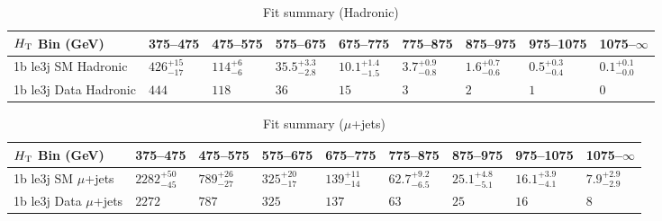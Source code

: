 \documentclass[8pt]{article}
\def\scalht{\mbox{$H_{\rm{T}}$}\xspace}
\newcommand\T{\rule{0pt}{2.6ex}}
\begin{document}
\begin{table}[ht!]
\caption{Fit summary (Hadronic)}
\label{tab:ensemble-summary}
\centering
\begin{tabular}{ lllllllll }

\hline
\scalht Bin (GeV)       & 375--475                       & 475--575                       & 575--675                       & 675--775                       & 775--875                       & 875--975                       & 975--1075                      & 1075--$\infty$                 \\ [1.000000ex]
\hline
1b le3j SM Hadronic\T   & $426^{+15}_{-17}$              & $114^{+6}_{-6}$                & $35.5^{+3.3}_{-2.8}$           & $10.1^{+1.4}_{-1.5}$           & $3.7^{+0.9}_{-0.8}$            & $1.6^{+0.7}_{-0.6}$            & $0.5^{+0.3}_{-0.4}$            & $0.1^{+0.1}_{-0.0}$            \\ 
1b le3j Data Hadronic\T & $444$                          & $118$                          & $36$                           & $15$                           & $3$                            & $2$                            & $1$                            & $0$                            \\ 
\hline

\end{tabular}
\end{table}
\begin{table}[ht!]
\caption{Fit summary ($\mu$+jets)}
\label{tab:ensemble-summary}
\centering
\begin{tabular}{ lllllllll }

\hline
\scalht Bin (GeV)       & 375--475                       & 475--575                       & 575--675                       & 675--775                       & 775--875                       & 875--975                       & 975--1075                      & 1075--$\infty$                 \\ [1.000000ex]
\hline
1b le3j SM $\mu$+jets\T & $2282^{+50}_{-45}$             & $789^{+26}_{-27}$              & $325^{+20}_{-17}$              & $139^{+11}_{-14}$              & $62.7^{+9.2}_{-6.5}$           & $25.1^{+4.8}_{-5.1}$           & $16.1^{+3.9}_{-4.1}$           & $7.9^{+2.9}_{-2.9}$            \\ 
1b le3j Data $\mu$+jets\T & $2272$                         & $787$                          & $325$                          & $137$                          & $63$                           & $25$                           & $16$                           & $8$                            \\ 
\hline

\end{tabular}
\end{table}
\end{document}
